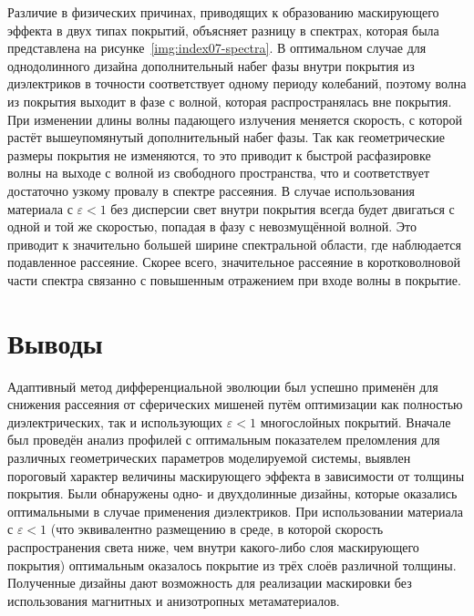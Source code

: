 Различие в физических причинах, приводящих к образованию маскирующего
эффекта в двух типах покрытий, объясняет разницу в спектрах, которая
была представлена на рисунке~\ref{img:index07-spectra}. В оптимальном
случае для однодолинного дизайна дополнительный набег фазы внутри
покрытия из диэлектриков в точности соответствует одному периоду
колебаний, поэтому волна из покрытия выходит в фазе с волной, которая
распространялась вне покрытия. При изменении длины волны падающего
излучения меняется скорость, с которой растёт вышеупомянутый
дополнительный набег фазы. Так как геометрические размеры покрытия не
изменяются, то это приводит к быстрой расфазировке волны на выходе с
волной из свободного пространства, что и соответствует достаточно
узкому провалу в спектре рассеяния. В случае использования материала с
${\varepsilon<1}$ без дисперсии свет внутри покрытия всегда будет
двигаться с одной и той же скоростью, попадая в фазу с невозмущённой
волной. Это приводит к значительно большей ширине спектральной
области, где наблюдается подавленное рассеяние. Скорее всего,
значительное рассеяние в коротковолновой части спектра связанно с
повышенным отражением при входе волны в покрытие.

\section{Выводы}


Адаптивный метод дифференциальной эволюции был успешно применён для
снижения рассеяния от сферических мишеней путём оптимизации как
полностью диэлектрических, так и использующих $\varepsilon < 1$
многослойных покрытий.  Вначале был проведён анализ профилей с
оптимальным показателем преломления для различных геометрических
параметров моделируемой системы, выявлен пороговый характер величины
маскирующего эффекта в зависимости от толщины покрытия.  Были
обнаружены одно- и двухдолинные дизайны, которые оказались
оптимальными в случае применения диэлектриков. При использовании
материала с $\varepsilon < 1$ (что эквивалентно размещению в среде, в
которой скорость распространения света ниже, чем внутри какого-либо
слоя маскирующего покрытия) оптимальным оказалось покрытие из трёх
слоёв различной толщины. Полученные дизайны дают возможность для
реализации маскировки без использования магнитных и анизотропных
метаматериалов.



\clearpage